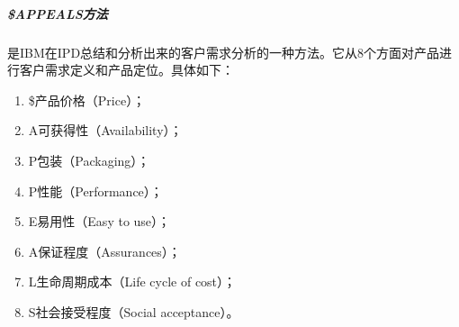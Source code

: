 \documentclass[letterpaper,10pt,english]{sphinxmanual}
\begin{document}
\subparagraph{\$APPEALS方法}
\label{\detokenize{chapter_knowledge/BRD:appeals}}
是IBM在IPD总结和分析出来的客户需求分析的一种方法。它从8个方面对产品进行客户需求定义和产品定位。具体如下：
%
\begin{footnote}[496]\sphinxAtStartFootnote
{}
%
\end{footnote}
\begin{enumerate}
%
\item {} 
\$\sphinxhyphen{}产品价格（Price）；

\item {} 
A\sphinxhyphen{}可获得性（Availability）；

\item {} 
P\sphinxhyphen{}包装（Packaging）；

\item {} 
P\sphinxhyphen{}性能（Performance）；

\item {} 
E\sphinxhyphen{}易用性（Easy to use）；

\item {} 
A\sphinxhyphen{}保证程度（Assurances）；

\item {} 
L\sphinxhyphen{}生命周期成本（Life cycle of cost）；

\item {} 
S\sphinxhyphen{}社会接受程度（Social acceptance）。

\end{enumerate}
\end{document}
